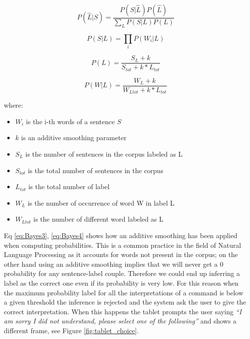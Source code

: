 \begin{equation} 
 P(\hat{L}|S)= \frac{P(S|\hat{L})P(\hat{L})}{\sum_L{P(S|L)P(L)}}
 \label{eq:Bayes1}
\end{equation}

\begin{equation}
 P(S|L) = \prod_i{P(W_i|L)}
 \label{eq:Bayes2}
\end{equation}

\begin{equation}
 P(L) = \frac{S_L + k}{S_{tot} + k* L_{tot}}
 \label{eq:Bayes3}
\end{equation}

\begin{equation}
 P(W|L) = \frac{W_L + k}{W_{Ltot} +k* L_{tot}}
 \label{eq:Bayes4}
\end{equation}

\noindent where:
\begin{itemize}
  \item[] $W_i$ is the i-th words of a sentence $S$
  \item[] $k$ is an additive smoothing parameter
  \item[] $S_L$ is the number of sentences in the corpus labeled as L
  \item[] $S_{tot}$ is the total number of sentences in the corpus
  \item[] $L_{tot}$ is the total number of label
  \item[] $W_L$ is the number of occurrence of word W in label L
  \item[] $W_{Ltot}$ is the number of different word labeled as L
\end{itemize}

Eq \ref{eq:Bayes3}, \ref{eq:Bayes4} shows how an additive smoothing has been applied when computing probabilities. This is a common practice in the field of Natural Language Processing as it accounts for words not present in the corpus; on the other hand using an additive smoothing implies that we will never get a 0 probability for any sentence-label couple. Therefore we could end up inferring a label as the correct one even if its probability is very low. For this reason when the maximum probability label for all the interpretations of a command is below a given threshold the inference is rejected and the system ask the user to give the correct interpretation. When this happens the tablet prompts the user saying \emph{``I am sorry I did not understand, please select one of the following''} and shows a different frame, see Figure \ref{fig:tablet_choice}.

